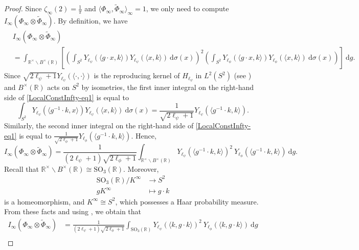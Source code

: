 \documentclass[11pt]{amsart}
\theoremstyle{definition}
\begin{document}
\begin{proof}
Since $\zeta_{\infty}(2) = \frac{1}{\pi}$ and $\langle \Phi_{\infty}, \widetilde{\Phi}_{\infty} \rangle_{\infty} = 1$, we only need to compute $I_{\infty}(\Phi_{\infty} \otimes \widetilde{\Phi}_{\infty})$. By definition, we have 
\begin{align}
    &I_{\infty}(\Phi_{\infty} \otimes \widetilde{\Phi}_{\infty}) \label{LocalConstInfty-eq1} \\
    &= \int_{\mathbb{R}^{\times} \backslash B^{\times}(\mathbb{R})} \left[ \left( \int_{S^2} Y_{\ell_{\psi}}(\langle g\cdot x, k \rangle ) Y_{\ell_{\psi}}(\langle x, k\rangle ) \: \mathrm{d}\sigma(x) \right)^2 \left( \int_{S^2} Y_{\ell_{\phi}}(\langle g\cdot x, k \rangle ) Y_{\ell_{\phi}}(\langle x, k\rangle ) \: \mathrm{d}\sigma(x) \right) \right] \: \mathrm{d}g. \nonumber
\end{align}
Since $\sqrt{2\ell_{\psi}+1}Y_{\ell_{\psi}}(\langle \cdot, \cdot \rangle)$ is the reproducing kernel of $H_{\ell_{\psi}}$ in $L^2(S^2)$ (see \cite[\S 2.3, Lemma 2.22]{MorimotoSphere}) and $B^{\times}(\mathbb{R})$ acts on $S^2$ by isometries, the first inner integral on the right-hand side of \eqref{LocalConstInfty-eq1} is equal to $$ \int_{S^2} Y_{\ell_{\psi}}(\langle g^{-1}\cdot k, x\rangle) Y_{\ell_{\psi}}(\langle x,k\rangle) \: \mathrm{d}\sigma(x) = \frac{1}{\sqrt{2\ell_{\psi}+1}} Y_{\ell_{\psi}}(\langle g^{-1}\cdot k, k\rangle ).$$ Similarly, the second inner integral on the right-hand side of \eqref{LocalConstInfty-eq1} is equal to $\frac{1}{\sqrt{2\ell_{\phi}+1}} Y_{\ell_{\phi}}(\langle g^{-1}\cdot k, k\rangle )$. Hence, $$ I_{\infty}(\Phi_{\infty} \otimes \widetilde{\Phi}_{\infty}) = \frac{1}{(2\ell_{\psi}+1)\sqrt{2\ell_{\phi}+1}} \int_{\mathbb{R}^{\times} \backslash B^{\times}(\mathbb{R})} Y_{\ell_{\psi}}(\langle g^{-1} \cdot k, k\rangle )^2 \: Y_{\ell_{\phi}}(\langle g^{-1}\cdot k, k\rangle) \: \mathrm{d}g.$$ Recall that $\mathbb{R}^{\times} \backslash B^{\times}(\mathbb{R}) \cong \mathrm{SO}_{3}(\mathbb{R})$. Moreover,
\begin{align*}
    \mathrm{SO}_{3}(\mathbb{R}) / K^{\infty} &\longrightarrow S^2 \\
    gK^{\infty} &\longmapsto g\cdot k
\end{align*}
is a homeomorphism, and $K^{\infty} \cong S^2$, which possesses a Haar probability measure. From these facts and using \cite[Thm.~2.51]{FollandHarmonic}, we obtain that
\begin{align*}
    I_{\infty}(\Phi_{\infty} \otimes \widetilde{\Phi}_{\infty}) &= \frac{1}{(2\ell_{\psi}+1)\sqrt{2\ell_{\phi}+1}} \int_{\mathrm{SO}_3(\mathbb{R})} Y_{\ell_{\psi}}(\langle k, g\cdot k\rangle )^2 \: Y_{\ell_{\phi}}(\langle k, g\cdot k\rangle) \: \mathrm{d}g \\

\end{align*}
\end{proof}
\end{document}
